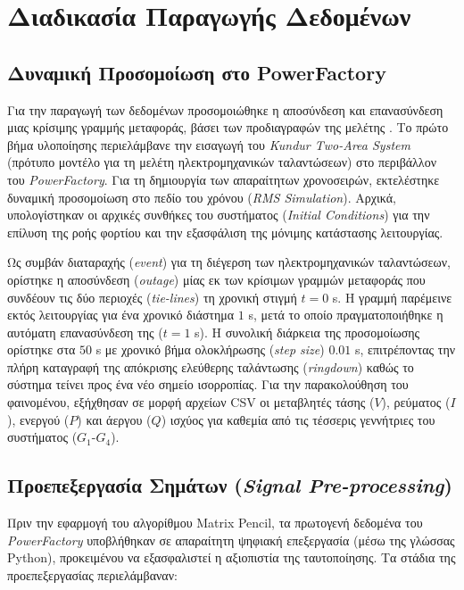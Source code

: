 \documentclass[conference]{IEEEtran}
\begin{document}
\section{Διαδικασία Παραγωγής Δεδομένων}
\subsection{Δυναμική Προσομοίωση στο PowerFactory}

Για την παραγωγή των δεδομένων προσομοιώθηκε η αποσύνδεση και επανασύνδεση μιας κρίσιμης γραμμής μεταφοράς, βάσει των προδιαγραφών της μελέτης \cite{firstmeeting2026}. Το πρώτο βήμα υλοποίησης περιελάμβανε την εισαγωγή του \textit{Kundur Two-Area System} (πρότυπο μοντέλο για τη μελέτη ηλεκτρομηχανικών ταλαντώσεων) στο περιβάλλον του \textit{PowerFactory}. Για τη δημιουργία των απαραίτητων χρονοσειρών, εκτελέστηκε δυναμική προσομοίωση στο πεδίο του χρόνου (\textit{RMS Simulation}). Αρχικά, υπολογίστηκαν οι αρχικές συνθήκες του συστήματος (\textit{Initial Conditions}) για την επίλυση της ροής φορτίου και την εξασφάλιση της μόνιμης κατάστασης λειτουργίας.

Ως συμβάν διαταραχής (\textit{event}) για τη διέγερση των ηλεκτρομηχανικών ταλαντώσεων, ορίστηκε η αποσύνδεση (\textit{outage}) μίας εκ των κρίσιμων γραμμών μεταφοράς που συνδέουν τις δύο περιοχές (\textit{tie-lines}) τη χρονική στιγμή $t = 0$ s. Η γραμμή παρέμεινε εκτός λειτουργίας για ένα χρονικό διάστημα $1$ s, μετά το οποίο πραγματοποιήθηκε η αυτόματη επανασύνδεση της ($t = 1$ s). Η συνολική διάρκεια της προσομοίωσης ορίστηκε στα $50$ s με χρονικό βήμα ολοκλήρωσης (\textit{step size}) $0.01$ s, επιτρέποντας την πλήρη καταγραφή της απόκρισης ελεύθερης ταλάντωσης (\textit{ringdown}) καθώς το σύστημα τείνει προς ένα νέο σημείο ισορροπίας. Για την παρακολούθηση του φαινομένου, εξήχθησαν σε μορφή αρχείων CSV οι μεταβλητές τάσης ($V$), ρεύματος ($I$), ενεργού ($P$) και άεργου ($Q$) ισχύος για καθεμία από τις τέσσερις γεννήτριες του συστήματος ($G_1$-$G_4$).

\subsection{Προεπεξεργασία Σημάτων (\textit{Signal Pre-processing})}
Πριν την εφαρμογή του αλγορίθμου Matrix Pencil, τα πρωτογενή δεδομένα του \textit{PowerFactory} υποβλήθηκαν σε απαραίτητη ψηφιακή επεξεργασία (μέσω της γλώσσας Python), προκειμένου να εξασφαλιστεί η αξιοπιστία της ταυτοποίησης. Τα στάδια της προεπεξεργασίας περιελάμβαναν:
\end{document}
